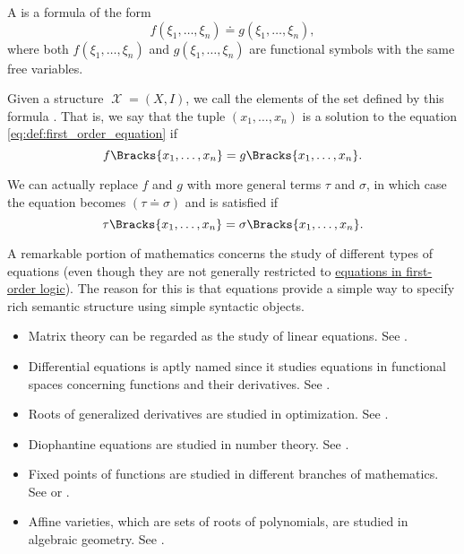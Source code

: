 \begin{definition}\label{def:first_order_equation}
  A  is a formula of the form
  \begin{equation}\label{eq:def:first_order_equation}
    f(\xi_1, \ldots, \xi_n) \doteq g(\xi_1, \ldots, \xi_n),
  \end{equation}
  where both \( f(\xi_1, \ldots, \xi_n) \) and \( g(\xi_1, \ldots, \xi_n) \) are functional symbols with the same free variables.

  Given a structure \( \mscrX = (X, I) \), we call the elements of the set defined by this formula . That is, we say that the tuple \( (x_1, \ldots, x_n) \) is a solution to the equation \eqref{eq:def:first_order_equation} if
  \begin{equation*}
    f\Bracks{x_1, \ldots, x_n} = g\Bracks{x_1, \ldots, x_n}.
  \end{equation*}

  We can actually replace \( f \) and \( g \) with more general terms \( \tau \) and \( \sigma \), in which case the equation becomes \( (\tau \doteq \sigma) \) and is satisfied if
  \begin{equation*}
    \tau\Bracks{x_1, \ldots, x_n} = \sigma\Bracks{x_1, \ldots, x_n}.
  \end{equation*}
\end{definition}

\begin{example}\label{ex:equations}
  A remarkable portion of mathematics concerns the study of different types of equations (even though they are not generally restricted to \hyperref[def:first_order_equation]{equations in first-order logic}). The reason for this is that equations provide a simple way to specify rich semantic structure using simple syntactic objects.

  \begin{itemize}
    \item Matrix theory can be regarded as the study of linear equations. See .
    \item Differential equations is aptly named since it studies equations in functional spaces concerning functions and their derivatives. See .
    \item Roots of generalized derivatives are studied in optimization. See .
    \item Diophantine equations are studied in number theory. See .
    \item Fixed points of functions are studied in different branches of mathematics. See  or .
    \item Affine varieties, which are sets of roots of polynomials, are studied in algebraic geometry. See .
  \end{itemize}
\end{example}

